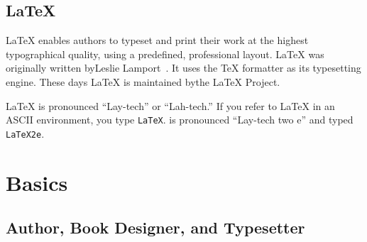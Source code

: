 \subsection{\LaTeX}

\LaTeX{} enables authors to typeset and print their work at the highest
typographical quality, using a predefined, professional layout. \LaTeX{} was
originally written byLeslie Lamport~\cite{manual}.
It uses the \TeX{} formatter as its typesetting engine. These days \LaTeX{}
is maintained bythe \LaTeX{} Project.


\LaTeX{} is pronounced ``Lay-tech'' or ``Lah-tech.'' If you refer to
\LaTeX{} in an ASCII environment, you type \texttt{LaTeX}.
\LaTeXe{} is pronounced ``Lay-tech two e'' and typed \texttt{LaTeX2e}.


%

\section{Basics}

\subsection{Author, Book Designer, and Typesetter}

